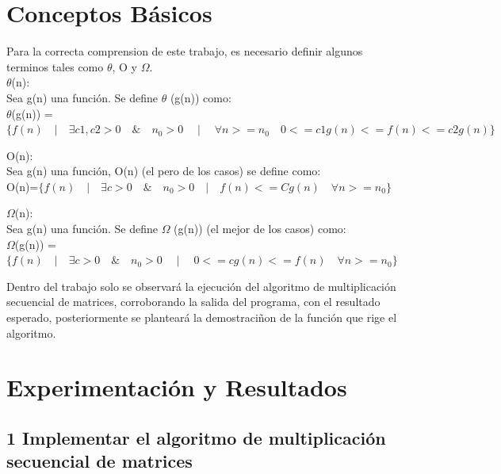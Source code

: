 \documentclass[spanish]{article}
\begin{document}
\newpage

	\section{Conceptos B\'asicos}
	Para la correcta comprension de este trabajo, es necesario definir algunos terminos tales como $\theta$, O y $\Omega$.\\
	 $\theta$(n):\\
		Sea g(n) una función. Se define  $\theta$ (g(n)) como:\\
		
		 	$\theta$(g(n)) = $\{ f(n) \quad | \quad \exists c1,c2>0 \quad \& \quad n_{0}>0 \quad \mid \quad \forall n>=n_{0} \quad 0<= c1g(n) <= f(n) <= c2g(n) \}$
	\bigskip		 	
		 	
	O(n):\\
		Sea  g(n)  una función, O(n) (el pero de los casos) se define como:\\
		
			\hspace{1cm}O(n)=$\{f(n) \quad | \quad \exists c >0 \quad \& \quad n_{0}>0 \quad | \quad f(n) <= Cg(n) \quad \forall  n>= n_{0} \}$
	\bigskip
	
	$\Omega$(n):\\
	Sea  g(n)  una función. Se define $\Omega$ (g(n)) (el mejor de los casos) como:\\

		\hspace{1cm}$\Omega$(g(n)) =$\{f(n) \quad | \quad \exists c >0 \quad \& \quad n_{0}>0 \quad \mid \quad  0<= cg(n)<= f(n) \quad \forall n>= n_{0} \}$
	\bigskip

	Dentro del trabajo solo se observará la ejecución del algoritmo de  multiplicación secuencial de matrices, corroborando la salida del programa, con el resultado esperado, posteriormente se planteará la demostraciñon de la función que rige el algoritmo.


		
	\newpage


\section{Experimentaci\'on y Resultados}

	\subsection{ 1 Implementar el algoritmo de  multiplicación secuencial de matrices}
	
\end{document}
